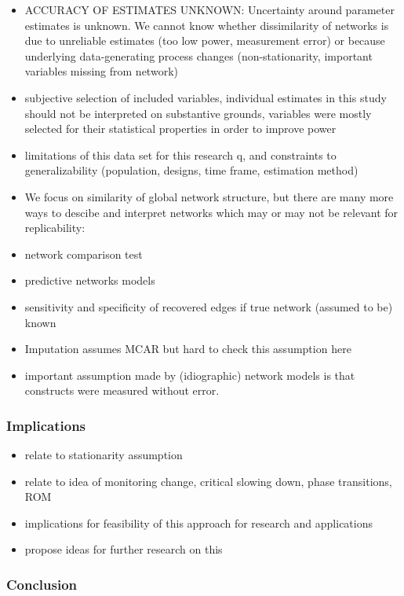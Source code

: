 \documentclass[
  english,
  man]{apa6}
\providecommand{\tightlist}{%
  \setlength{\itemsep}{0pt}\setlength{\parskip}{0pt}}
\begin{document}
\begin{itemize}
\item
  ACCURACY OF ESTIMATES UNKNOWN: Uncertainty around parameter estimates is unknown. We cannot know whether dissimilarity of networks is due to unreliable estimates (too low power, measurement error) or because underlying data-generating process changes (non-stationarity, important variables missing from network)
\item
  subjective selection of included variables, individual estimates in this study should not be interpreted on substantive grounds, variables were mostly selected for their statistical properties in order to improve power
\item
  limitations of this data set for this research q, and constraints to generalizability (population, designs, time frame, estimation method)
\item
  We focus on similarity of global network structure, but there are many more ways to descibe and interpret networks which may or may not be relevant for replicability:
\item
  network comparison test
\item
  predictive networks models
\item
  sensitivity and specificity of recovered edges if true network (assumed to be) known
\item
  Imputation assumes MCAR but hard to check this assumption here
\item
  important assumption made by (idiographic) network models is that constructs were measured without error.
\end{itemize}

\hypertarget{implications}{%
\subsubsection{Implications}\label{implications}}

\begin{itemize}
\tightlist
\item
  relate to stationarity assumption
\item
  relate to idea of monitoring change, critical slowing down, phase transitions, ROM
\item
  implications for feasibility of this approach for research and applications
\item
  propose ideas for further research on this
\end{itemize}

\hypertarget{conclusion}{%
\subsubsection{Conclusion}\label{conclusion}}
\end{document}
